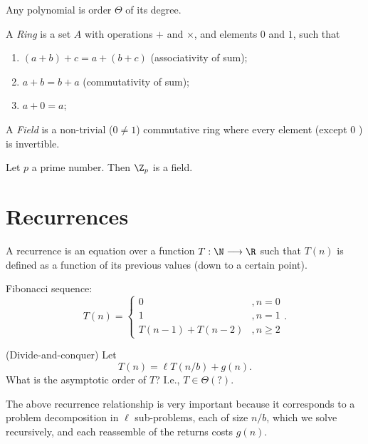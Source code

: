 \begin{lemma}
    Any polynomial is order $\Theta$ of its degree.
\end{lemma}

\begin{definition}
    A \emph{Ring} is a set $A$ with operations $+$ and $\times $, and elements $0$ and $1$, such that
    \begin{enumerate}
        \item $(a+b) + c = a + (b+c)$ (associativity of sum);
	\item $a+b = b+a$ (commutativity of sum);
	\item $a+0=a$;
    \end{enumerate}
\end{definition}

\begin{definition}
    A \emph{Field} is a non-trivial ($0\neq 1$) commutative ring where every element (except $0$ ) is invertible.
\end{definition}

\begin{lemma}
    Let $p$ a prime number.
    Then $\Z_p$ is a field.
\end{lemma}


\section*{Recurrences}

\begin{definition}
    A recurrence is an equation over a function $T: \N \longrightarrow \R$ such that $T(n)$ is defined as a function of its previous values (down to a certain point).
\end{definition}
\begin{eg}
    Fibonacci sequence: \[
    T(n) = \begin{cases}
	0 & ,n=0 \\
	1 & ,n=1 \\
	T(n-1)+T(n-2) &, n\ge 2
    \end{cases}
    .\] 
\end{eg}

\begin{problem}
    (Divide-and-conquer)
    Let \[
	T(n) = \ell T(n/b) + g(n)
    .\] 
    What is the asymptotic order of $T$? I.e., $T\in \Theta(?)$.
\end{problem}
The above recurrence relationship is very important because it corresponds to a problem decomposition in $\ell$ sub-problems, each of size $n / b$, which we solve recursively, and each reassemble of the returns costs $g(n)$.

